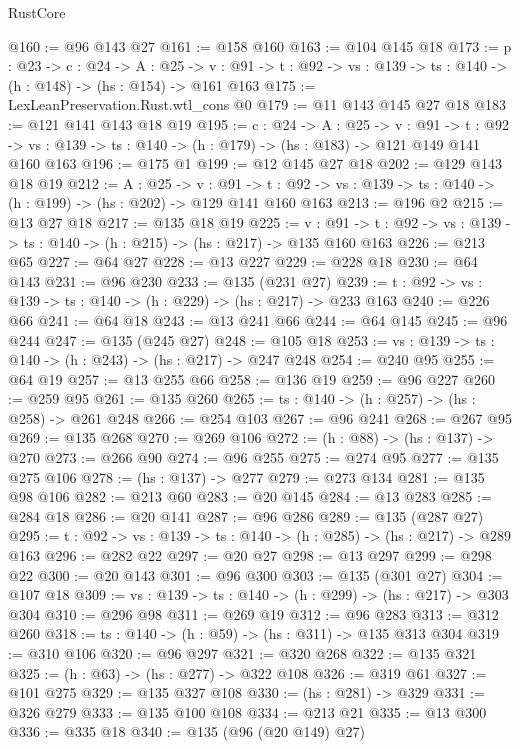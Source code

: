 \begin{lexlean}{RustCore}
\begin{coremodule}
@160 := @96 @143 @27
@161 := @158 @160
@163 := @104 @145 @18
@173 := {p : @23} ->
  {c : @24} ->
  {A : @25} ->
  {v : @91} -> {t : @92} -> {vs : @139} -> {ts : @140} -> (h : @148) -> (hs : @154) -> @161 @163
@175 := LexLeanPreservation.Rust.wtl_cons @0
@179 := @11 @143 @145 @27 @18
@183 := @121 @141 @143 @18 @19
@195 := {c : @24} ->
  {A : @25} ->
  {v : @91} ->
  {t : @92} -> {vs : @139} -> {ts : @140} -> (h : @179) -> (hs : @183) -> @121 @149 @141 @160 @163
@196 := @175 @1
@199 := @12 @145 @27 @18
@202 := @129 @143 @18 @19
@212 := {A : @25} ->
  {v : @91} ->
  {t : @92} -> {vs : @139} -> {ts : @140} -> (h : @199) -> (hs : @202) -> @129 @141 @160 @163
@213 := @196 @2
@215 := @13 @27 @18
@217 := @135 @18 @19
@225 := {v : @91} ->
  {t : @92} -> {vs : @139} -> {ts : @140} -> (h : @215) -> (hs : @217) -> @135 @160 @163
@226 := @213 @65
@227 := @64 @27
@228 := @13 @227
@229 := @228 @18
@230 := @64 @143
@231 := @96 @230
@233 := @135 (@231 @27)
@239 := {t : @92} -> {vs : @139} -> {ts : @140} -> (h : @229) -> (hs : @217) -> @233 @163
@240 := @226 @66
@241 := @64 @18
@243 := @13 @241 @66
@244 := @64 @145
@245 := @96 @244
@247 := @135 (@245 @27)
@248 := @105 @18
@253 := {vs : @139} -> {ts : @140} -> (h : @243) -> (hs : @217) -> @247 @248
@254 := @240 @95
@255 := @64 @19
@257 := @13 @255 @66
@258 := @136 @19
@259 := @96 @227
@260 := @259 @95
@261 := @135 @260
@265 := {ts : @140} -> (h : @257) -> (hs : @258) -> @261 @248
@266 := @254 @103
@267 := @96 @241
@268 := @267 @95
@269 := @135 @268
@270 := @269 @106
@272 := (h : @88) -> (hs : @137) -> @270
@273 := @266 @90
@274 := @96 @255
@275 := @274 @95
@277 := @135 @275 @106
@278 := (hs : @137) -> @277
@279 := @273 @134
@281 := @135 @98 @106
@282 := @213 @60
@283 := @20 @145
@284 := @13 @283
@285 := @284 @18
@286 := @20 @141
@287 := @96 @286
@289 := @135 (@287 @27)
@295 := {t : @92} -> {vs : @139} -> {ts : @140} -> (h : @285) -> (hs : @217) -> @289 @163
@296 := @282 @22
@297 := @20 @27
@298 := @13 @297
@299 := @298 @22
@300 := @20 @143
@301 := @96 @300
@303 := @135 (@301 @27)
@304 := @107 @18
@309 := {vs : @139} -> {ts : @140} -> (h : @299) -> (hs : @217) -> @303 @304
@310 := @296 @98
@311 := @269 @19
@312 := @96 @283
@313 := @312 @260
@318 := {ts : @140} -> (h : @59) -> (hs : @311) -> @135 @313 @304
@319 := @310 @106
@320 := @96 @297
@321 := @320 @268
@322 := @135 @321
@325 := (h : @63) -> (hs : @277) -> @322 @108
@326 := @319 @61
@327 := @101 @275
@329 := @135 @327 @108
@330 := (hs : @281) -> @329
@331 := @326 @279
@333 := @135 @100 @108
@334 := @213 @21
@335 := @13 @300
@336 := @335 @18
@340 := @135 (@96 (@20 @149) @27)

\end{coremodule}
\end{lexlean}
